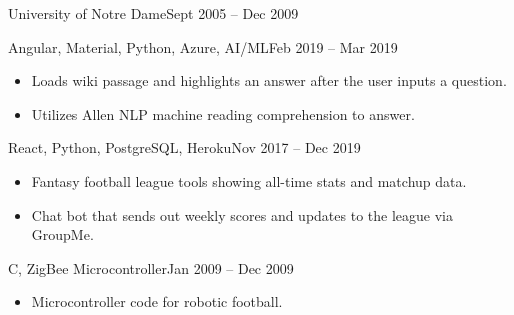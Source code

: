  {University of Notre Dame}{Sept 2005 -- Dec 2009 \hspace{1 cm}}{}




\smallskip
{}

\smallskip
{}


\smallskip
{}
{Angular, Material, Python, Azure, AI/ML}{Feb 2019 -- Mar 2019}{}
\begin{itemize}
\item Loads wiki passage and highlights an answer after the user inputs a question.
\item Utilizes Allen NLP machine reading comprehension to answer.
\end{itemize}

\divider

{React, Python, PostgreSQL, Heroku}{Nov 2017 -- Dec 2019}{}
\begin{itemize}
\item  Fantasy football league tools showing all-time stats and matchup data.
\item  Chat bot that sends out weekly scores and updates to the league via GroupMe.
\end{itemize}

\divider

{C, ZigBee Microcontroller}{Jan 2009 -- Dec 2009}{}
\begin{itemize}
\item  Microcontroller code for robotic football.
\end{itemize}
